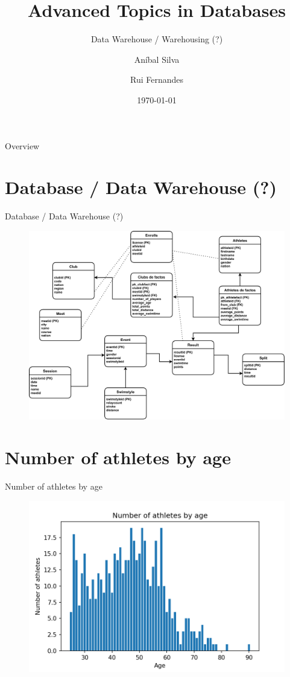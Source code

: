 \documentclass[aspectratio=169,xcolor=dvipsnames]{beamer}
\title[short title]{Advanced Topics in Databases}
\subtitle{Data Warehouse / Warehousing (?)}
\author{Aníbal Silva \and Rui Fernandes}
\date{\today}
\begin{document}
\renewcommand{\today}{\ifcase \month\or January\or February\or March\or %
April\or May\or June\or July\or August\or September\or October\or November\or %
December\fi, \number \year}

\begin{frame}
    \titlepage
\end{frame}

\begin{frame}{Overview}
    \tableofcontents
\end{frame}

\section{Database / Data Warehouse (?)}
\begin{frame}{Database / Data Warehouse (?)}
    \begin{figure}[H]
        \centering
        \includegraphics[width=.65\textwidth]{img/datawarehouse.pdf}
    \end{figure}
\end{frame}


\section{Number of athletes by age}
\begin{frame}{Number of athletes by age}
    \begin{figure}[H]
        \centering
        \includegraphics[width=.7\textwidth]{img/athletesbyage.png}
    \end{figure}
\end{frame}
\end{document}
